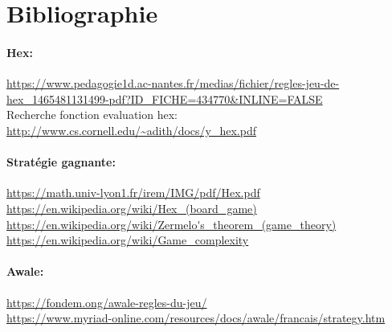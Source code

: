 \section{Bibliographie}





\paragraph{Hex:}
\url{https://www.pedagogie1d.ac-nantes.fr/medias/fichier/regles-jeu-de-hex_1465481131499-pdf?ID_FICHE=434770&INLINE=FALSE}\\
Recherche fonction evaluation hex: \url{http://www.cs.cornell.edu/~adith/docs/y_hex.pdf}

\paragraph{Stratégie gagnante:}
\url{https://math.univ-lyon1.fr/irem/IMG/pdf/Hex.pdf}\\
\url{https://en.wikipedia.org/wiki/Hex_(board_game)}\\
\url{https://en.wikipedia.org/wiki/Zermelo's_theorem_(game_theory)}\\
\url{https://en.wikipedia.org/wiki/Game_complexity}

\paragraph{Awale:}
\url{https://fondem.ong/awale-regles-du-jeu/}\\
\url{https://www.myriad-online.com/resources/docs/awale/francais/strategy.htm}
